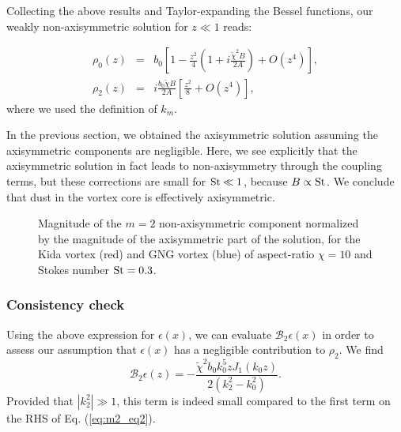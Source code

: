 \documentclass[apj]{emulateapj}
\newcommand{\Eq}[1]{Eq. (\ref{#1})}
\newcommand{\eq}[1]{\Eq{#1}}
\newcommand{\beq}{\begin{equation}}
\newcommand{\eeq}{\end{equation}}
\newcommand{\beqn}{\begin{eqnarray}}
\newcommand{\eeqn}{\end{eqnarray}}
\newcommand{\St}{{\rm St}}
\begin{document}
Collecting the above results and Taylor-expanding the Bessel functions, our
weakly non-axisymmetric solution for $z\ll 1$ reads:

\beqn
\rho_0(z) &=& b_0\left[1 -
  \frac{z^2}{4}\left(1+i\frac{\tilde{\chi}^2B}{2A}\right)
+ O(z^4)\right],\\
\rho_2(z) &=&
i\frac{b_0\tilde{\chi}B}{2A}\left[\frac{z^2}{8}+O(z^4)\right],  
\eeqn 
where we used the definition of $k_m$. 

In the previous section, we obtained the axisymmetric solution
assuming the axisymmetric components are negligible. Here, we 
see explicitly that the axisymmetric solution in fact leads to
non-axisymmetry through the coupling terms, but these corrections are
small for $\St\ll1$, because $B\propto\St$. 
We conclude that dust in the vortex core is effectively axisymmetric.   

\begin{figure}
  \begin{center}
  \end{center}
  \caption[]{Magnitude of the $m=2$ non-axisymmetric component normalized by the magnitude of the axisymmetric part of the solution, for the Kida vortex (red) and GNG vortex (blue) of aspect-ratio $\chi=10$ and Stokes number $\St=0.3$. }
 \label{fig:nonaxi}
\end{figure}



\subsubsection{Consistency check}
Using the above expression for $\epsilon(x)$, we can evaluate
$\mathcal{B}_2\epsilon(x)$ in order to assess our assumption that
$\epsilon(x)$ has a negligible contribution to $\rho_2$. We find
\beq
\mathcal{B}_2\epsilon(z) =
-\frac{\tilde{\chi}^2b_0k_0^5zJ_1(k_0z)}{2\left(k_2^2 -
  k_0^2\right)}. 
\eeq
Provided that $|k_2^2|\gg1$, this term is indeed small compared to the
first term on the RHS of \eq{eq:m2_eq2}.
\end{document}
